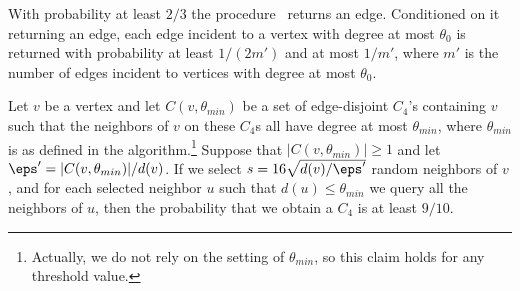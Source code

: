 \begin{claim}\label{clm:select-edge} 
With probability at least $2/3$ the procedure \SelectEdge\ returns an edge. Conditioned on it returning an edge, each edge incident to a vertex with degree at most $\theta_0$ is returned with probability at least $1/(2m')$ and at most $1/m'$, where $m'$ is the number of edges incident to vertices with degree at most $\theta_0$.
\end{claim}

\begin{claim}\label{clm:C4-ub1}
Let $v$ be a vertex and let $C(v,\theta_{min})$ be a set of edge-disjoint $C_4$'s 
containing $v$ such that the neighbors of $v$ on these $C_4$s all have degree at most $\theta_{min}$, where $\theta_{min}$ is as defined in the algorithm.\footnote{Actually, we do not rely on the setting of $\theta_{min}$, so this claim holds for any threshold value.} Suppose that $|C(v,\theta_{min})|\geq 1$ and let $\eps' = |C(v,\theta_{min})|/d(v)$.
If we select $s = 16\sqrt{d(v)/\eps'}$ random neighbors of $v$, and for each selected neighbor $u$ such that {$d(u)\leq \theta_{min}$} we query all the neighbors of $u$,
then the probability that we obtain a $C_4$ is at least $9/10$.
\end{claim}

